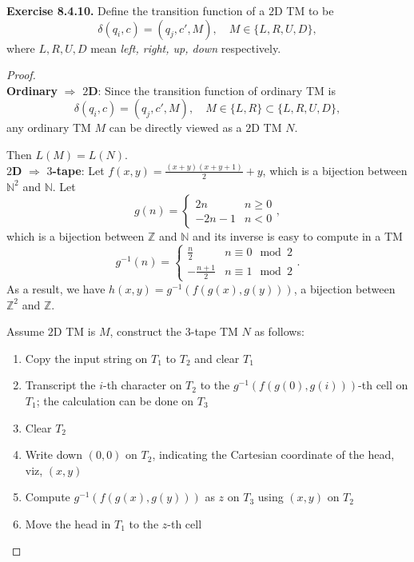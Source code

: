 \documentclass[a4paper]{article}
\newtheorem*{proof}{Proof}
\newenvironment{exercise}[1]{
	\par
	\noindent\textbf{Exercise #1.}\quad
}{
	\par
	\bigskip
}
\newcommand{\Nset}{\mathbb{N}}
\newcommand{\Zset}{\mathbb{Z}}
\begin{document}
\begin{exercise}{8.4.10} Define the transition function of a $2$D TM to be
    $$
    \delta(q_i,c)=(q_j,c',M),\quad M\in\{L,R,U,D\},
    $$
    where $L,R,U,D$ mean \textit{left, right, up, down} respectively.
    \begin{proof}\hspace{0pt}\\
    \textbf{Ordinary} $\Rightarrow$ \textbf{$2$D}:
        Since the transition function of ordinary TM is
        $$
        \delta(q_i,c)=(q_j,c',M),\quad M\in\{L,R\}\subset\{L,R,U,D\},
        $$
        any ordinary TM $M$ can be directly viewed as a $2$D TM $N$.\par
        Then $L(M)=L(N)$.\\
    \textbf{$2$D} $\Rightarrow$ \textbf{$3$-tape}:
        Let $f(x,y)=\frac{(x+y)(x+y+1)}{2}+y$, which is a bijection between $\Nset^2$ and $\Nset$.
        Let
        $$
        g(n)=\begin{cases}
            2n & n\geqslant 0\\
            -2n-1 & n<0
        \end{cases},
        $$
        which is a bijection between $\Zset$ and $\Nset$ and its inverse is easy to compute in a TM
        $$
        g^{-1}(n)=\begin{cases}
            \frac n 2 & n\equiv 0 \mod 2\\
            -\frac{n+1}{2} & n\equiv 1 \mod 2
        \end{cases}.
        $$
        As a result, we have $h(x,y)=g^{-1}(f(g(x),g(y)))$, a bijection between $\Zset^2$ and $\Zset$.\par
        Assume $2$D TM is $M$, construct the $3$-tape TM $N$ as follows:
        \begin{enumerate}
            \item Copy the input string on $T_1$ to $T_2$ and clear $T_1$
            \item Transcript the $i$-th character on $T_2$ to the $g^{-1}(f(g(0),g(i)))$-th cell on $T_1$;
                the calculation can be done on $T_3$
            \item Clear $T_2$
            \item Write down $(0,0)$ on $T_2$, indicating the Cartesian coordinate of the head, viz, $(x,y)$
            \item Compute $g^{-1}(f(g(x),g(y)))$ as $z$ on $T_3$ using $(x,y)$ on $T_2$
            \item Move the head in $T_1$ to the $z$-th cell

\end{enumerate}
\end{proof}
\end{exercise}
\end{document}
